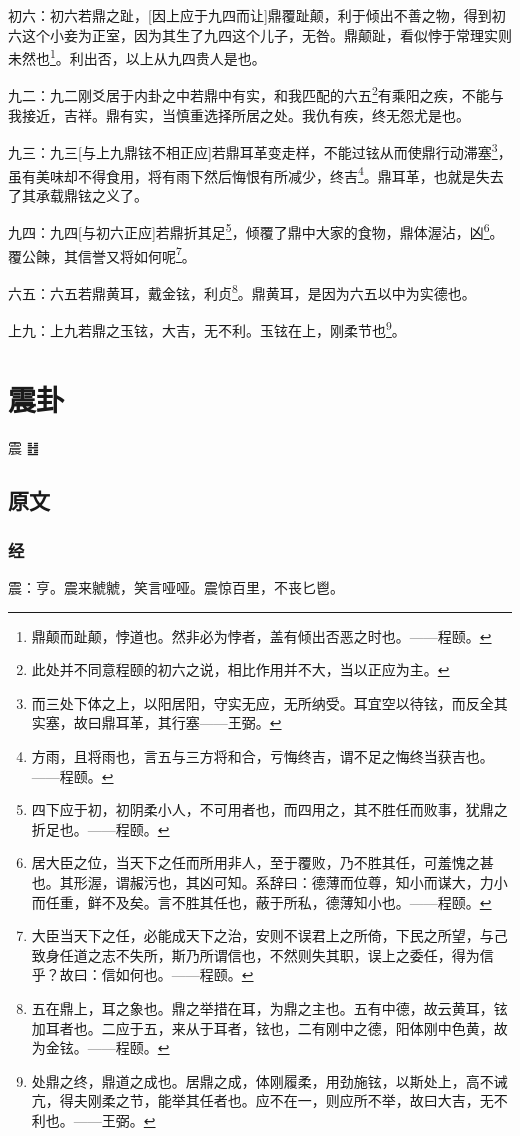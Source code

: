 \documentclass[12pt,oneside]{book}
\begin{document}
初六：初六若鼎之趾，[因上应于九四而让]鼎覆趾颠，利于倾出不善之物，得到初六这个小妾为正室，因为其生了九四这个儿子，无咎。鼎颠趾，看似悖于常理实则未然也\footnote{鼎颠而趾颠，悖道也。然非必为悖者，盖有倾出否恶之时也。——程颐。}。利出否，以上从九四贵人是也。

九二：九二刚爻居于内卦之中若鼎中有实，和我匹配的六五\footnote{此处并不同意程颐的初六之说，相比作用并不大，当以正应为主。}有乘阳之疾，不能与我接近，吉祥。鼎有实，当慎重选择所居之处。我仇有疾，终无怨尤是也。

九三：九三[与上九鼎铉不相正应]若鼎耳革变走样，不能过铉从而使鼎行动滞塞\footnote{而三处下体之上，以阳居阳，守实无应，无所纳受。耳宜空以待铉，而反全其实塞，故曰鼎耳革，其行塞——王弼。}，虽有美味却不得食用，将有雨下然后悔恨有所减少，终吉\footnote{方雨，且将雨也，言五与三方将和合，亏悔终吉，谓不足之悔终当获吉也。——程颐。}。鼎耳革，也就是失去了其承载鼎铉之义了。

九四：九四[与初六正应]若鼎折其足\footnote{四下应于初，初阴柔小人，不可用者也，而四用之，其不胜任而败事，犹鼎之折足也。——程颐。}，倾覆了鼎中大家的食物，鼎体渥沾，凶\footnote{居大臣之位，当天下之任而所用非人，至于覆败，乃不胜其任，可羞愧之甚也。其形渥，谓赧污也，其凶可知。系辞曰：德薄而位尊，知小而谋大，力小而任重，鲜不及矣。言不胜其任也，蔽于所私，德薄知小也。——程颐。}。覆公餗，其信誉又将如何呢\footnote{大臣当天下之任，必能成天下之治，安则不误君上之所倚，下民之所望，与己致身任道之志不失所，斯乃所谓信也，不然则失其职，误上之委任，得为信乎？故曰：信如何也。——程颐。}。

六五：六五若鼎黄耳，戴金铉，利贞\footnote{五在鼎上，耳之象也。鼎之举措在耳，为鼎之主也。五有中德，故云黄耳，铉加耳者也。二应于五，来从于耳者，铉也，二有刚中之德，阳体刚中色黄，故为金铉。——程颐。}。鼎黄耳，是因为六五以中为实德也。

上九：上九若鼎之玉铉，大吉，无不利。玉铉在上，刚柔节也\footnote{处鼎之终，鼎道之成也。居鼎之成，体刚履柔，用劲施铉，以斯处上，高不诫亢，得夫刚柔之节，能举其任者也。应不在一，则应所不举，故曰大吉，无不利也。——王弼。}。




\chapter{震卦}
震 {\large ䷲}
\section{原文}

\subsection{经}
震：亨。震来虩虩，笑言哑哑。震惊百里，不丧匕鬯。
\end{document}
